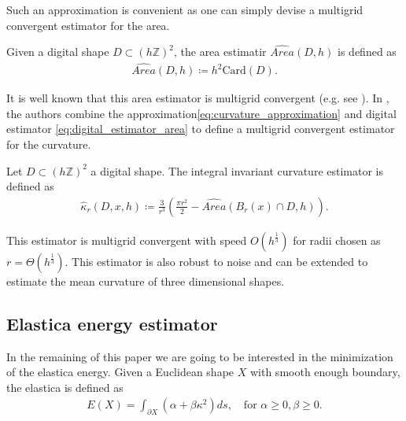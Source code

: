 \documentclass[runningheads]{llncs}
\begin{document}
Such an approximation is convenient as one can simply devise a multigrid convergent estimator for the area.

\begin{definition}	
  Given a digital shape $D \subset (h \mathbb{Z})^2$,  the area estimatir $\widehat{Area}(D,h)$ is defined as	
  \begin{align}
    \widehat{Area}(D,h) \coloneqq h^2\text{Card}\left( D \right).	
    \label{eq:digital_estimator_area}
  \end{align}
\end{definition}
It is well known that this area estimator is multigrid convergent
(e.g. see \cite{klette2000multigrid}).  In
\cite{coeurjolly13integral}, the authors combine the
approximation\eqref{eq:curvature_approximation} and digital estimator
\eqref{eq:digital_estimator_area} to define a multigrid convergent
estimator for the curvature.

\begin{definition}
  Let $D \subset (h \mathbb{Z})^2$ a digital shape. The integral invariant curvature estimator is defined as
  \begin{align*}
    \hat{\kappa}_{r}(D,x,h) \coloneqq \frac{3}{r^3} \left( \frac{\pi r^2}{2} - \widehat{Area} \left( B_{r} ( x ) \cap D, h \right) \right).
  \end{align*}
\end{definition}

This estimator is multigrid convergent with speed $O(h^\frac{1}{3})$
for radii chosen as $r=\Theta(h^\frac{1}{3})$.  This estimator is also
robust to noise and can be extended to estimate the mean curvature of
three dimensional shapes.

\subsection{Elastica energy estimator}

In the remaining of this paper we are going to be interested in the minimization of the elastica energy. Given a Euclidean shape $X$ with smooth enough boundary, the elastica is defined as
\begin{align}
  E(X) = \int_{\partial X}{(\alpha + \beta \kappa^2) ds}, \quad \text{for~} \alpha \ge 0, \beta \ge 0.
  \label{eq:elastica}
\end{align}
\end{document}
